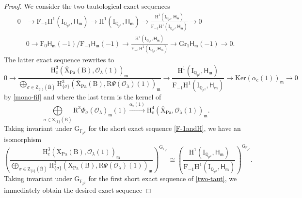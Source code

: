 \documentclass[10pt]{amsart}
\numberwithin{equation}{section}
\theoremstyle{definition}
\def\Ker{\mathrm{Ker}}
\def\Pa{\mathrm{Pa}}
\def\calO{\mathcal{O}}
\def\fracm{\mathfrak{m}}
\def\FF{\mathbb{F}}
\def\sfH{\mathsf{H}}
\def\QQ{\mathbb{Q}}
\def\rmc{\mathrm{c}}
\def\rmB{\mathrm{B}}
\def\rmF{\mathrm{F}}
\def\rmG{\mathrm{G}}
\def\rmH{\mathrm{H}}
\def\rmI{\mathrm{I}}
\def\rmR{\mathrm{R}}
\def\rmX{\mathrm{X}}
\def\rmZ{\mathrm{Z}}
\begin{document}
\begin{proof}
We consider the two tautological exact sequences
 \begin{equation}\label{two-taut}
\begin{aligned}
0&\rightarrow \mathrm{F}_{-1}\mathrm{H}^{1}(\mathrm{I}_{\QQ_{p^{2}}}, \mathsf{H}_{\fracm})\rightarrow \rmH^{1}(\rmI_{\QQ_{p^{2}}}, \mathsf{H}_{\fracm}) \rightarrow \frac{\rmH^{1}(\rmI_{\QQ_{p^{2}}}, \sfH_{\fracm})}{\mathrm{F}_{-1}\mathrm{H}^{1}(\mathrm{I}_{\QQ_{p^{2}}}, \sfH_{\fracm})}\rightarrow 0\\
&0\rightarrow \rmF_{0}\sfH_{\fracm}(-1)/\rmF_{-1}\sfH_{\fracm}(-1)\rightarrow \frac{\rmH^{1}(\rmI_{\QQ_{p^{2}}}, \mathsf{H}_{\fracm})}{\mathrm{F}_{-1}\mathrm{H}^{1}(\mathrm{I}_{\QQ_{p^{2}}}, \mathsf{H}_{\fracm})}\rightarrow \mathrm{Gr}_{1}\sfH_{\fracm}(-1)\rightarrow 0.
\end{aligned}
\end{equation}
The latter exact sequence rewrites to
\begin{equation}\label{F-1andH}
0\rightarrow\frac{\rmH^{3}_{\mathrm{c}}(\overline{\rmX}_{\Pa}(\rmB), \calO_{\lambda}(1))_{\fracm}}{\bigoplus\limits_{\sigma\in \rmZ_{\{1\}}(\overline{\rmB})}\rmH^{3}_{\{\sigma\}}(\overline{\rmX}_{\Pa}(\rmB), \rmR\Psi(\calO_{\lambda})(1))_{\fracm}}\rightarrow\frac{\rmH^{1}(\rmI_{\QQ_{p^{2}}}, \mathsf{H}_{\fracm})}{\mathrm{F}_{-1}\mathrm{H}^{1}(\mathrm{I}_{\QQ_{p^{2}}}, \mathsf{H}_{\fracm})}\rightarrow \Ker(\alpha_{\rmc}(1))_{\fracm}\rightarrow 0
\end{equation}
by \eqref{mono-fil} and where the last term is the kernel of 
\begin{equation*}
\bigoplus\limits_{\sigma\in\rmZ_{\{1\}}(\overline{\rmB})}\rmR^{3}\Phi_{\sigma}(\calO_{\lambda})_{\fracm}(1)\xrightarrow{\alpha_{\rmc}(1)} \rmH^{4}_{\mathrm{c}}(\overline{\rmX}_{\Pa}, \calO_{\lambda}(1))_{\fracm}.
\end{equation*}
Taking invariant under $\rmG_{\FF_{p^{2}}}$ for the short exact sequence \ref{F-1andH}, we have an isomorphism  
\begin{equation*}
(\frac{\rmH^{3}_{\mathrm{c}}(\overline{\rmX}_{\Pa}(\rmB), \calO_{\lambda}(1))_{\fracm}}{\bigoplus\limits_{\sigma\in \rmZ_{\{1\}}(\overline{\rmB})}\rmH^{3}_{\{\sigma\}}(\overline{\rmX}_{\Pa}(\rmB), \rmR\Psi(\calO_{\lambda})(1))_{\fracm}})^{\rmG_{\FF_{p^{2}}}}\cong (\frac{\rmH^{1}(\rmI_{\QQ_{p^{2}}}, \sfH_{\fracm})}{\mathrm{F}_{-1}\mathrm{H}^{1}(\mathrm{I}_{\QQ_{p^{2}}}, \sfH_{\fracm})})^{\rmG_{\FF_{p^{2}}}}.
\end{equation*}
Taking invariant under $\rmG_{\FF_{p^{2}}}$ for the first short exact sequence of \eqref{two-taut}, we immediately obtain the desired exact sequence

\end{proof}
\end{document}
